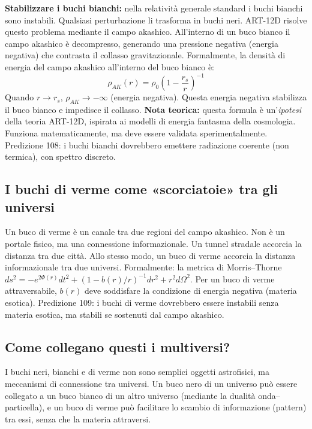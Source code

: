 \textbf{Stabilizzare i buchi bianchi:} nella relatività generale standard i buchi bianchi sono instabili. Qualsiasi perturbazione li trasforma in buchi neri. ART-12D risolve questo problema mediante il campo akashico. All'interno di un buco bianco il campo akashico è decompresso, generando una pressione negativa (energia negativa) che contrasta il collasso gravitazionale. Formalmente, la densità di energia del campo akashico all'interno del buco bianco è:
\begin{equation}
\rho_{AK}(r) = \rho_0 \left(1 - \frac{r_s}{r}\right)^{-1}
\end{equation}
Quando $r \to r_s$, $\rho_{AK} \to -\infty$ (energia negativa). Questa energia negativa stabilizza il buco bianco e impedisce il collasso. \textbf{Nota teorica:} questa formula è un'\textit{ipotesi} della teoria ART-12D, ispirata ai modelli di energia fantasma della cosmologia. Funziona matematicamente, ma deve essere validata sperimentalmente. Predizione 108: i buchi bianchi dovrebbero emettere radiazione coerente (non termica), con spettro discreto.

\subsection{I buchi di verme come «scorciatoie» tra gli universi}
Un buco di verme è un canale tra due regioni del campo akashico. Non è un portale fisico, ma una connessione informazionale. Un tunnel stradale accorcia la distanza tra due città. Allo stesso modo, un buco di verme accorcia la distanza informazionale tra due universi. Formalmente: la metrica di Morris--Thorne $ds^2 = -e^{2\Phi(r)}dt^2 + (1-b(r)/r)^{-1}dr^2 + r^2 d\Omega^2$. Per un buco di verme attraversabile, $b(r)$ deve soddisfare la condizione di energia negativa (materia esotica). Predizione 109: i buchi di verme dovrebbero essere instabili senza materia esotica, ma stabili se sostenuti dal campo akashico.

\subsection{Come collegano questi i multiversi?}
I buchi neri, bianchi e di verme non sono semplici oggetti astrofisici, ma meccanismi di connessione tra universi. Un buco nero di un universo può essere collegato a un buco bianco di un altro universo (mediante la dualità onda--particella), e un buco di verme può facilitare lo scambio di informazione (pattern) tra essi, senza che la materia attraversi.

